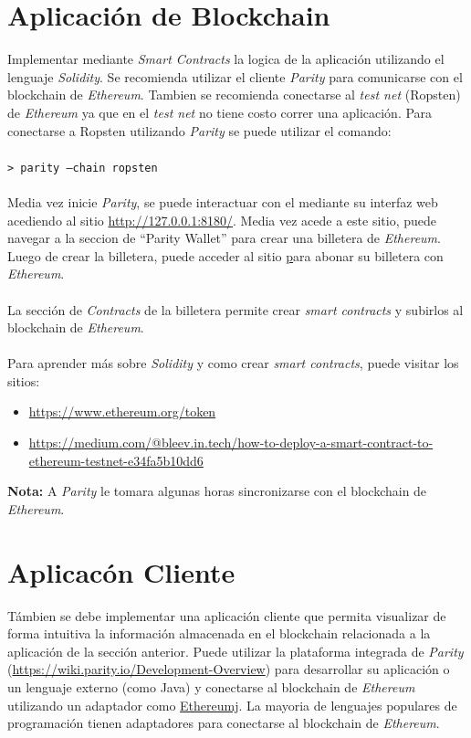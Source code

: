 \documentclass{article}
\begin{document}
\section*{Aplicaci\'on de Blockchain}
Implementar mediante \emph{Smart Contracts} la logica de la aplicaci\'on utilizando
el lenguaje \emph{Solidity}. Se recomienda utilizar el cliente \emph{Parity} para
comunicarse con el blockchain de \emph{Ethereum}. Tambien se recomienda conectarse
al \emph{test net} (Ropsten) de \emph{Ethereum} ya que en el \emph{test net} no
tiene costo correr una aplicaci\'on. Para conectarse a Ropsten utilizando \emph{Parity}
se puede utilizar el comando:
\\\\
\texttt{> parity --chain ropsten}
\\\\
Media vez inicie \emph{Parity}, se puede interactuar con el mediante su interfaz web
acediendo al sitio \url{http://127.0.0.1:8180/}. Media vez acede a este sitio, puede
navegar a la seccion de ``Parity Wallet'' para crear una billetera de \emph{Ethereum}.
Luego de crear la billetera, puede acceder al sitio \href{http://faucet.ropsten.be:3001/}
para abonar su billetera con \emph{Ethereum}.
\\\\
La secci\'on de \emph{Contracts} de la billetera permite crear \emph{smart contracts} y
subirlos al blockchain de \emph{Ethereum}.
\\\\
Para aprender m\'as sobre \emph{Solidity} y como crear \emph{smart contracts}, puede visitar
los sitios:
\begin{itemize}
        \item{\url{https://www.ethereum.org/token}}
        \item{\url{https://medium.com/@bleev.in.tech/how-to-deploy-a-smart-contract-to-ethereum-testnet-e34fa5b10dd6}}
\end{itemize}
{\bf Nota: }A \emph{Parity} le tomara algunas horas sincronizarse con el blockchain de
\emph{Ethereum}.
\section*{Aplicac\'on Cliente}
T\'ambien se debe implementar una aplicaci\'on cliente que permita visualizar de forma intuitiva
la informaci\'on almacenada en el blockchain relacionada a la aplicaci\'on de la secci\'on anterior.
Puede utilizar la plataforma integrada de \emph{Parity} (\url{https://wiki.parity.io/Development-Overview})
para desarrollar su aplicaci\'on o un lenguaje externo (como Java) y conectarse al blockchain de \emph{Ethereum}
utilizando un adaptador como \href{https://github.com/ethereum/ethereumj}{Ethereumj}. La mayoria de lenguajes
populares de programaci\'on tienen adaptadores para conectarse al blockchain de \emph{Ethereum}.
\end{document}
